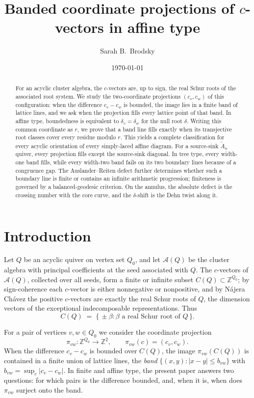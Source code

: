 \documentclass[11pt, a4paper]{amsart}
\title[Banded projections of affine $c$-vectors]{%
  Banded coordinate projections of $c$-vectors in affine type}
\author{Sarah B.\ Brodsky}
\date{\today}
\theoremstyle{definition}
\newcommand{\ZZ}{\mathbb{Z}}
\newcommand{\cA}{\mathcal{A}}
\begin{document}
\begin{abstract}
For an acyclic cluster algebra, the $c$-vectors are, up to sign, the real
Schur roots of the associated root system. We study the two-coordinate
projections $(c_v, c_w)$ of this configuration: when the difference
$c_v - c_w$ is bounded, the image lies in a finite band of lattice lines,
and we ask when the projection fills every lattice point of that band. In
affine type, boundedness is equivalent to $\delta_v=\delta_w$ for the null
root $\delta$. Writing this common coordinate as $r$, we prove that a band
line fills exactly when its transjective root classes cover every residue
modulo $r$. This yields a complete classification for every acyclic
orientation of every simply-laced affine diagram. For a source-sink
$\widetilde A_n$ quiver, every projection fills except the source-sink
diagonal. In tree type, every width-one band fills, while every width-two
band fails on its two boundary lines because of a congruence gap. The
Auslander--Reiten defect further determines whether such a boundary line is
finite or contains an infinite arithmetic progression; finiteness is
governed by a balanced-geodesic criterion. On the annulus, the absolute
defect is the crossing number with the core curve, and the $\delta$-shift is
the Dehn twist along it.
\end{abstract}

\maketitle

\section{Introduction}
\label{sec:intro}

Let $Q$ be an acyclic quiver on vertex set $Q_0$, and let $\cA(Q)$ be the
cluster algebra with principal coefficients at the seed associated with
$Q$. The $c$-vectors of $\cA(Q)$, collected over all seeds, form a finite
or infinite subset $C(Q) \subset \ZZ^{Q_0}$; by sign-coherence
\cite{GHKK2018} each $c$-vector is either nonnegative or nonpositive, and
by N\'ajera Ch\'avez \cite{NajeraChavez2013} the positive $c$-vectors are
exactly the real Schur roots of $Q$, the dimension vectors of the
exceptional indecomposable representations. Thus
\[
  C(Q) \;=\; \{\, \pm\beta : \beta \text{ a real Schur root of } Q \,\}.
\]

For a pair of vertices $v, w \in Q_0$ we consider the coordinate
projection
\[
  \pi_{vw} \colon \ZZ^{Q_0} \to \ZZ^2,
  \qquad
  \pi_{vw}(c) = (c_v, c_w).
\]
When the difference $c_v - c_w$ is bounded over $C(Q)$, the image
$\pi_{vw}(C(Q))$ is contained in a finite union of lattice lines, the
\emph{band} $\{(x, y) : |x - y| \leq b_{vw}\}$ with $b_{vw} = \sup_{c}|c_v
- c_w|$. In finite and affine type, the present paper answers two questions: for
which pairs is the difference bounded, and, when it is, when does
$\pi_{vw}$ surject onto the band.
\end{document}
